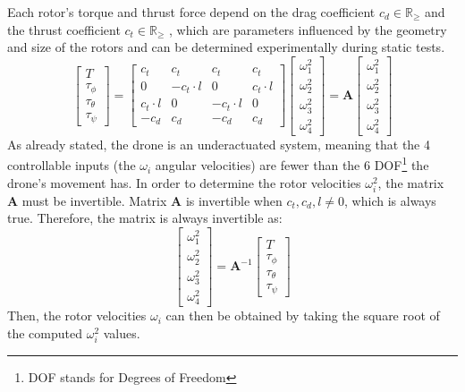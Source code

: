 Each rotor’s torque and thrust force depend on the drag 
coefficient \( c_d \in \mathbb{R}_\geq \) and the thrust coefficient 
\( c_t \in \mathbb{R}_\geq \) \cite{geometric_control}, which are parameters influenced by the 
geometry and size of the rotors and can be determined experimentally 
during static tests.
\[
\begin{bmatrix}
T \\
\tau_\phi \\
\tau_\theta \\
\tau_\psi
\end{bmatrix}
=
\begin{bmatrix}
    c_t & c_t & c_t & c_t \\
    0 & -c_t \cdot l & 0 & c_t \cdot l \\
    c_t \cdot l & 0 & -c_t \cdot l & 0 \\
    -c_d & c_d & -c_d & c_d
\end{bmatrix}
\begin{bmatrix}
\omega_1^2 \\
\omega_2^2 \\
\omega_3^2 \\
\omega_4^2
\end{bmatrix}
= 
\mathbf{A}
\begin{bmatrix}
    \omega_1^2 \\
    \omega_2^2 \\
    \omega_3^2 \\
    \omega_4^2
\end{bmatrix}
\]
As already stated, the drone is an underactuated system, 
meaning that the 4 controllable inputs (the \( \omega_i \) angular velocities) are 
fewer than the 6 DOF\footnote{DOF stands for Degrees of Freedom} the drone's movement has. 
In order to determine the rotor velocities \( \omega_i^2 \), 
the matrix \( \mathbf{A} \) must be invertible.
Matrix \( \mathbf{A} \) is invertible when \( c_t, c_d, l \neq 0 \), which is always true. 
Therefore, the matrix is always invertible as:
\begin{equation}
\begin{bmatrix}
\omega_1^2 \\
\omega_2^2 \\
\omega_3^2 \\
\omega_4^2
\end{bmatrix}
=
\mathbf{A}^{-1}
\begin{bmatrix}
T \\
\tau_\phi \\
\tau_\theta \\
\tau_\psi
\end{bmatrix}
\label{eq:rotor_velocities}
\end{equation}
Then, the rotor velocities \( \omega_i \) can then be obtained by 
taking the square root of the computed \( \omega_i^2 \) values.

